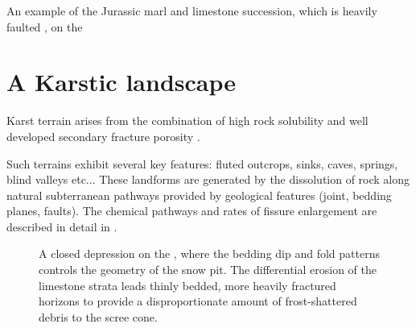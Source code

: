 \begin{marginfigure}
\checkoddpage \ifoddpage \forcerectofloat \else \forceversofloat \fi
\centering

 \caption{An example of the Jurassic marl and limestone succession, which is heavily faulted , on the \protect{}}
 \label{fig:limestones and marls}
\end{marginfigure}


 \section{A Karstic landscape}
Karst terrain arises from the combination of high rock solubility and well developed secondary fracture porosity \citep{ford2013karst}. 

Such terrains exhibit several key features: fluted outcrops, sinks, caves, springs, blind valleys etc... These landforms are generated by the dissolution of rock along natural subterranean pathways provided by geological features (joint, bedding planes, faults). The chemical pathways and rates of fissure enlargement are described in detail in \citet{dreybrodt1996principles}.

\begin{figure}[t!]
\checkoddpage \ifoddpage \forcerectofloat \else \forceversofloat \fi
{}
\caption{A closed depression on the , where the bedding dip and fold patterns controls the geometry of the snow pit. The differential erosion of the limestone strata leads thinly bedded, more heavily fractured horizons to provide a disproportionate amount of frost-shattered debris to the scree cone.  }
\label{fig:closed_depression}
\end{figure}

